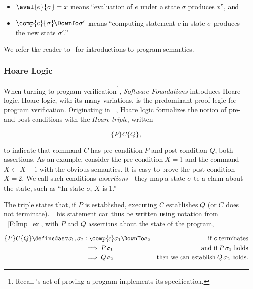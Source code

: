 \begin{itemize}
    \item \(\eval{e}{\sigma} = x\) means ``evaluation of \(e\) under a state
        \(\sigma\) produces \(x\)'', and

    \item \(\comp{c}{\sigma} \DownTo \sigma'\) means ``computing statement \(c\)
        in state \(\sigma\) produces the new state \(\sigma'\).''
\end{itemize}

We refer the reader to~\cite{Winskel_1993,Harper_2016} for introductions to
program semantics.

\subsubsection{Hoare Logic}

When turning to program verification\footnote{Recall \citeauthor{EWD:EWD1036}'s
act of proving a program implements its specification.}, \emph{Software
Foundations} introduces Hoare logic. Hoare logic, with its many variations, is
the predominant proof logic for program verification. Originating in
\citeyear{Hoare_1969}~\cite{Hoare_1969}, Hoare logic formalizes the notion of
pre- and post-conditions with the \emph{Hoare triple}, written

\begin{equation*}
    \{P\} C \{Q\},
\end{equation*}

to indicate that command \(C\) has pre-condition \(P\) and post-condition \(Q\),
both assertions. As an example, consider
the pre-condition \(X = 1\) and the command \(X \gets X + 1\) with the obvious
semantics. It is easy to prove the post-condition \(X = 2\). We call such
conditions \emph{assertions}---they map a state \(\sigma\) to a claim about the
state, such as ``In state \(\sigma\), \(X\) is 1.''

The triple states that, if \(P\) is established, executing \(C\) establishes
\(Q\) (or \(C\) does not terminate). This statement can thus be written using
notation from \figurename~\ref{F:Imp_ex}, with \(P\) and \(Q\) assertions about
the state of the program,

\begin{align*}
    \{P\} C \{Q\} \definedas \forall \sigma_1, \sigma_2 &: \comp{c}\sigma_1 \DownTo \sigma_2 &\text{if \(\mathtt{c}\) terminates} \\
    &\implies P\, \sigma_1 &\text{and if \(P\, \sigma_1\) holds} \\
    &\implies Q\, \sigma_2 &\text{then we can establish \(Q\, \sigma_2\) holds.}
\end{align*}

